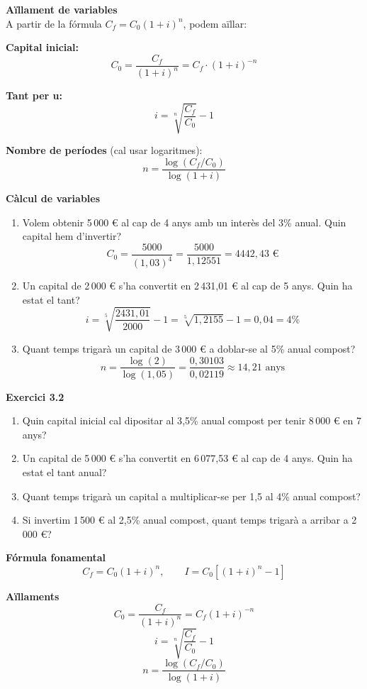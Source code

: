 \documentclass[12pt]{article}
\begin{document}
\begin{concept}
\textbf{Aïllament de variables}\\
A partir de la fórmula $C_f = C_0(1+i)^n$, podem aïllar:

\textbf{Capital inicial:}
\[
C_0 = \dfrac{C_f}{(1+i)^n} = C_f \cdot (1+i)^{-n}
\]

\textbf{Tant per u:}
\[
i = \sqrt[n]{\dfrac{C_f}{C_0}} - 1
\]

\textbf{Nombre de períodes} (cal usar logaritmes):
\[
n = \dfrac{\log(C_f / C_0)}{\log(1+i)}
\]
\end{concept}

\begin{exemple}
\textbf{Càlcul de variables}
\begin{enumerate}[label=\alph*)]
    \item Volem obtenir 5\,000 € al cap de 4 anys amb un interès del 3\% anual. Quin capital hem d'invertir?
    \[
    C_0 = \dfrac{5000}{(1{,}03)^4} = \dfrac{5000}{1{,}12551} = 4442{,}43 \text{ €}
    \]
    \item Un capital de 2\,000 € s'ha convertit en 2\,431{,}01 € al cap de 5 anys. Quin ha estat el tant?
    \[
    i = \sqrt[5]{\dfrac{2431{,}01}{2000}} - 1 = \sqrt[5]{1{,}2155} - 1 = 0{,}04 = 4\%
    \]
    \item Quant temps trigarà un capital de 3\,000 € a doblar-se al 5\% anual compost?
    \[
    n = \dfrac{\log(2)}{\log(1{,}05)} = \dfrac{0{,}30103}{0{,}02119} \approx 14{,}21 \text{ anys}
    \]
\end{enumerate}
\end{exemple}

\begin{exercici}
\textbf{Exercici 3.2}\\
\begin{enumerate}[label=\alph*)]
    \item Quin capital inicial cal dipositar al 3{,}5\% anual compost per tenir 8\,000 € en 7 anys?
    \item Un capital de 5\,000 € s'ha convertit en 6\,077{,}53 € al cap de 4 anys. Quin ha estat el tant anual?
    \item Quant temps trigarà un capital a multiplicar-se per 1{,}5 al 4\% anual compost?
    \item Si invertim 1\,500 € al 2{,}5\% anual compost, quant temps trigarà a arribar a 2\,000 €?
\end{enumerate}
\end{exercici}

\begin{resum}[title=Resum 3: Interès Compost]
\textbf{Fórmula fonamental}
\[
C_f = C_0(1+i)^n, \qquad I = C_0\left[(1+i)^n - 1\right]
\]

\textbf{Aïllaments}
\[
C_0 = \dfrac{C_f}{(1+i)^n} = C_f(1+i)^{-n}
\]
\[
i = \sqrt[n]{\dfrac{C_f}{C_0}} - 1
\]
\[
n = \dfrac{\log(C_f/C_0)}{\log(1+i)}
\]
\end{resum}
\end{document}
